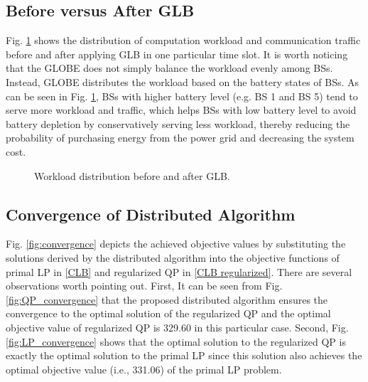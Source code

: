 \documentclass[12pt, draftclsnofoot, letterpaper, onecolumn]{IEEEtran}
\begin{document}
{\subsection{Before versus After GLB}
Fig. \ref{fig:GLB} shows the distribution of computation workload and communication traffic before and after applying GLB in one particular time slot. It is worth noticing that the GLOBE does not simply balance the workload evenly among BSs. Instead, GLOBE distributes the workload based on the battery states of BSs. As can be seen in  Fig. \ref{fig:GLB}, BSs with higher battery level (e.g. BS 1 and BS 5) tend to serve more workload and traffic, which helps BSs with low battery level to avoid  battery depletion by conservatively serving less workload, thereby reducing the probability of purchasing energy from the power grid and decreasing the system cost.
\begin{figure}[h]
	\centering	
	\caption{Workload distribution before and after GLB.}
	\label{fig:GLB}
\vspace{-20pt}
\end{figure}

\subsection{Convergence of Distributed Algorithm}
Fig. \ref{fig:convergence} depicts the achieved objective values by substituting the solutions derived by the distributed algorithm into the objective functions of primal LP in \eqref{CLB} and regularized QP in \eqref{CLB regularized}. There are several observations worth pointing out. First, It can be seen from Fig. \ref{fig:QP_convergence} that the proposed distributed algorithm ensures the convergence to the optimal solution of the regularized QP and the optimal objective value of regularized QP is 329.60 in this particular case. Second, Fig. \ref{fig:LP_convergence} shows that the optimal solution to the regularized QP is exactly the optimal solution to the primal LP since this solution also achieves the optimal objective value (i.e., 331.06) of the primal LP problem.

\begin{figure}[h]
	\centering	
	

\end{figure}}
\end{document}

